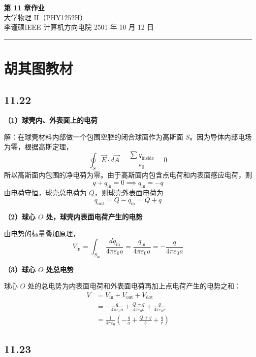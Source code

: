 \documentclass[UTF8,a4paper,12pt]{ctexart}
\begin{document}
\begin{center}
  {\LARGE\bfseries 第 11 章作业}\\[0.55em]
  {\normalsize 大学物理 II（PHY1252H）}\\[0.95em]
  {\small 李谨硕\quad IEEE 计算机方向\quad 电院 2501 年 10 月 12 日}
\end{center}
\vspace{-0.2em}
{\centering\textcolor{black!30}{\rule{0.9\textwidth}{0.8pt}}\par}
\vspace{0.6em}

\section*{胡其图教材}

\subsection*{11.22}

\textbf{（1）球壳内、外表面上的电荷}

解：在球壳材料内部做一个包围空腔的闭合球面作为高斯面 $S$。因为导体内部电场为零，根据高斯定理，
\[
\oint_S\vec{E}\cdot d\vec{A}
=
\frac{\sum q_{\text{inside}}}{\varepsilon_0}
=
0
\]
所以高斯面内包围的净电荷为零。由于高斯面内包含点电荷和内表面感应电荷，则
\[
q+q_{\text{in}}=0
\implies
q_{\text{in}}=-q
\]
由电荷守恒，球壳总电荷为 $Q$，则球壳外表面电荷为
\[
q_{\text{out}}=Q-q_{\text{in}}=Q+q
\]

\textbf{（2）球心 $O$ 处，球壳内表面电荷产生的电势}

由电势的标量叠加原理，
\[
V_{\text{in}}
=
\int_{S_{\text{in}}}\frac{dq_{\text{in}}}{4\pi\varepsilon_0a}
=
\frac{q_{\text{in}}}{4\pi\varepsilon_0a}
=
-\frac{q}{4\pi\varepsilon_0a}
\]

\textbf{（3）球心 $O$ 处总电势}

球心 $O$ 处的总电势为内表面电荷和外表面电荷再加上点电荷产生的电势之和：
\[
\begin{aligned}
V
&=
V_{\text{in}}+V_{\text{out}}+V_{\text{dot}}\\
&=
-\frac{q}{4\pi\varepsilon_0a}
+\frac{Q+q}{4\pi\varepsilon_0b}
+\frac{q}{4\pi\varepsilon_0r}\\
&=
\frac{1}{4\pi\varepsilon_0}
\left(
-\frac{q}{a}+\frac{Q+q}{b}+\frac{q}{r}
\right)
\end{aligned}
\]

\subsection*{11.23}
\end{document}
